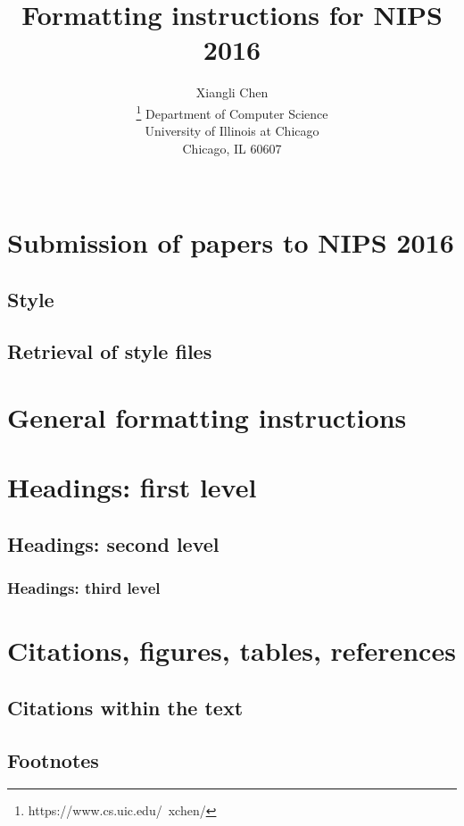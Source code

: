 \documentclass{article}
\title{Formatting instructions for NIPS 2016}
\author{
Xiangli Chen\\
\thanks{https://www.cs.uic.edu/~xchen/}
Department of Computer Science\\
University of Illinois at Chicago\\
Chicago, IL 60607\\
\textt{xchen40@uic.edu}\\
}
\begin{document}

\maketitle

\begin{abstract}
\end{abstract}

\section{Submission of papers to NIPS 2016}
\subsection{Style}
\subsection{Retrieval of style files}
\section{General formatting instructions}
\section{Headings: first level}
\subsection{Headings: second level}
\subsubsection{Headings: third level}
\section{Citations, figures, tables, references}
\subsection{Citations within the text}
\subsection{Footnotes}
\end{document}
